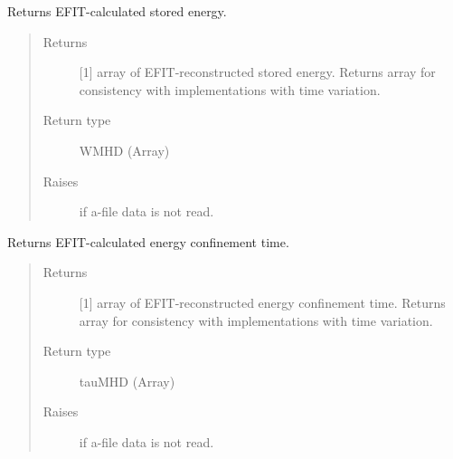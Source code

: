 \documentclass[letterpaper,10pt,english]{sphinxmanual}
\begin{document}
\begin{fulllineitems}
\begin{fulllineitems}
\label{\detokenize{eqtools:eqtools.eqdskreader.EqdskReader.getWMHD}}
Returns EFIT-calculated stored energy.
\begin{quote}\begin{description}
\item[{Returns}] \leavevmode
{[}1{]} array of EFIT-reconstructed stored energy.
Returns array for consistency with
{\hyperref[\detokenize{eqtools:eqtools.core.Equilibrium}]{}}
implementations with time variation.

\item[{Return type}] \leavevmode
WMHD (Array)

\item[{Raises}] \leavevmode
{} \textendash{} if a-file data is not read.

\end{description}\end{quote}

\end{fulllineitems}


\begin{fulllineitems}
\label{\detokenize{eqtools:eqtools.eqdskreader.EqdskReader.getTauMHD}}
Returns EFIT-calculated energy confinement time.
\begin{quote}\begin{description}
\item[{Returns}] \leavevmode
{[}1{]} array of EFIT-reconstructed energy confinement
time.  Returns array for consistency with
{\hyperref[\detokenize{eqtools:eqtools.core.Equilibrium}]{}}
implementations with time variation.

\item[{Return type}] \leavevmode
tauMHD (Array)

\item[{Raises}] \leavevmode
{} \textendash{} if a-file data is not read.

\end{description}\end{quote}


\end{fulllineitems}
\end{fulllineitems}
\end{document}
